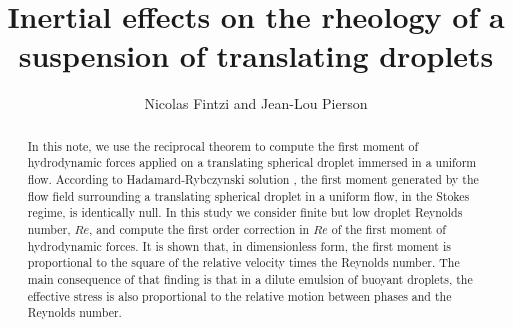 \documentclass[12pt]{My_preprint}
\title{
    Inertial effects on the rheology of a suspension of translating droplets
    }
\author[1,2]{Nicolas Fintzi and  Jean-Lou Pierson}
\begin{document}
\maketitle

\begin{abstract}
    In this note, we use the reciprocal theorem to compute the first moment of hydrodynamic forces applied on a translating spherical droplet immersed in a uniform flow. 
    According to Hadamard-Rybczynski solution \citep{kim2013microhydrodynamics}, the first moment generated by the flow field surrounding a translating spherical droplet in a uniform flow, in the Stokes regime, is identically null. 
    In this study we consider finite but low droplet Reynolds number, $Re$, and compute the first order correction in $Re$ of the first moment of hydrodynamic forces. 
    It is shown that, in dimensionless form, the first moment is proportional to the square of the relative velocity times the Reynolds number.  
    The main consequence of that finding is that in a dilute emulsion of buoyant droplets, the effective stress is also proportional to the relative motion between phases and the Reynolds number. 
\end{abstract}






\appendix
\end{document}
